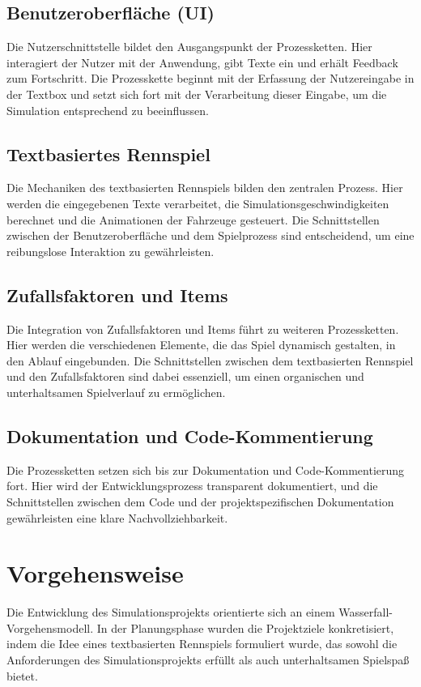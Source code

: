 \documentclass{article}
\begin{document}
\subsection{Benutzeroberfläche (UI)}
Die Nutzerschnittstelle bildet den Ausgangspunkt der Prozessketten. Hier interagiert der Nutzer mit der Anwendung, gibt Texte ein und erhält Feedback zum Fortschritt. Die Prozesskette beginnt mit der Erfassung der Nutzereingabe in der Textbox und setzt sich fort mit der Verarbeitung dieser Eingabe, um die Simulation entsprechend zu beeinflussen.

\subsection{Textbasiertes Rennspiel}
Die Mechaniken des textbasierten Rennspiels bilden den zentralen Prozess. Hier werden die eingegebenen Texte verarbeitet, die Simulationsgeschwindigkeiten berechnet und die Animationen der Fahrzeuge gesteuert. Die Schnittstellen zwischen der Benutzeroberfläche und dem Spielprozess sind entscheidend, um eine reibungslose Interaktion zu gewährleisten.

\subsection{Zufallsfaktoren und Items}
Die Integration von Zufallsfaktoren und Items führt zu weiteren Prozessketten. Hier werden die verschiedenen Elemente, die das Spiel dynamisch gestalten, in den Ablauf eingebunden. Die Schnittstellen zwischen dem textbasierten Rennspiel und den Zufallsfaktoren sind dabei essenziell, um einen organischen und unterhaltsamen Spielverlauf zu ermöglichen.

\subsection{Dokumentation und Code-Kommentierung}
Die Prozessketten setzen sich bis zur Dokumentation und Code-Kommentierung fort. Hier wird der Entwicklungsprozess transparent dokumentiert, und die Schnittstellen zwischen dem Code und der projektspezifischen Dokumentation gewährleisten eine klare Nachvollziehbarkeit.

\section{Vorgehensweise}
Die Entwicklung des Simulationsprojekts orientierte sich an einem Wasserfall-Vorgehensmodell. In der Planungsphase wurden die Projektziele konkretisiert, indem die Idee eines textbasierten Rennspiels formuliert wurde, das sowohl die Anforderungen des Simulationsprojekts erfüllt als auch unterhaltsamen Spielspaß bietet.
\end{document}
